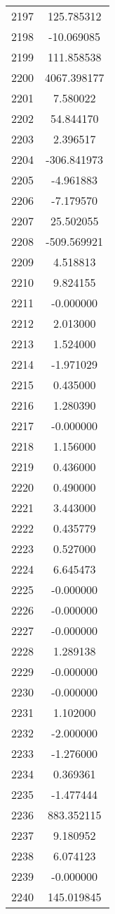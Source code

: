 \documentclass[12pt]{article}
\begin{document}
\begin{longtable}{@{}cc@{}}
2197 & 125.785312 \\
2198 & -10.069085 \\
2199 & 111.858538 \\
2200 & 4067.398177 \\
2201 & 7.580022 \\
2202 & 54.844170 \\
2203 & 2.396517 \\
2204 & -306.841973 \\
2205 & -4.961883 \\
2206 & -7.179570 \\
2207 & 25.502055 \\
2208 & -509.569921 \\
2209 & 4.518813 \\
2210 & 9.824155 \\
2211 & -0.000000 \\
2212 & 2.013000 \\
2213 & 1.524000 \\
2214 & -1.971029 \\
2215 & 0.435000 \\
2216 & 1.280390 \\
2217 & -0.000000 \\
2218 & 1.156000 \\
2219 & 0.436000 \\
2220 & 0.490000 \\
2221 & 3.443000 \\
2222 & 0.435779 \\
2223 & 0.527000 \\
2224 & 6.645473 \\
2225 & -0.000000 \\
2226 & -0.000000 \\
2227 & -0.000000 \\
2228 & 1.289138 \\
2229 & -0.000000 \\
2230 & -0.000000 \\
2231 & 1.102000 \\
2232 & -2.000000 \\
2233 & -1.276000 \\
2234 & 0.369361 \\
2235 & -1.477444 \\
2236 & 883.352115 \\
2237 & 9.180952 \\
2238 & 6.074123 \\
2239 & -0.000000 \\
2240 & 145.019845 \\

\end{longtable}
\end{document}
